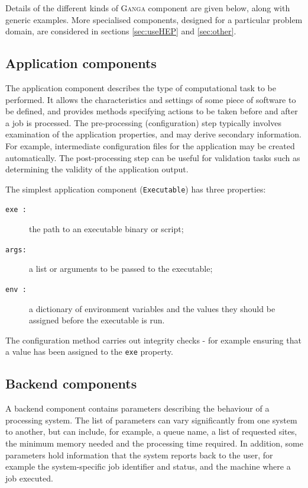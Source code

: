 \documentclass{elsart}
\def\ganga {\textsc{Ganga}\xspace}
\newcommand{\code}[1]{\texttt{#1}}
\begin{document}
Details of the different kinds of \ganga component are given below, along with
generic examples. More specialised components, designed for a particular
problem domain, are considered in sections \ref{sec:useHEP} and \ref{sec:other}.

\subsection{Application components}

The application component describes the type of computational task to be
performed.  It allows the characteristics and settings of some
piece of software to be defined, and provides methods specifying
actions to be taken before and after a job is processed.  The
pre-processing (configuration) step typically involves examination of
the application properties, and may derive secondary
information. For example, intermediate configuration files for the
application may be created automatically. The post-processing step can
be useful for validation tasks such as determining the validity
of the application output.

The simplest application component (\texttt{Executable}) has three properties:
\begin{description}
\item[\code{exe :}] the path to an executable binary or script;
\item[\code{args:}] a list or arguments to be passed to the executable;
\item[\code{env :}] a dictionary of environment variables and the values they
  should be assigned before the executable is run.
\end{description}
The configuration method carries out integrity checks - for example
ensuring that a value has been assigned to the \code{exe} property.

\subsection{Backend components}
A backend component contains parameters describing the
behaviour of a processing system. The list of
parameters can vary significantly from one system to another, but can include,
for example, a queue name, a list of requested sites, the minimum memory
needed and the processing time required. In addition, some parameters hold
information that the system reports back to the user, for example the 
system-specific job identifier and status, and the machine where a
job executed.
\end{document}
